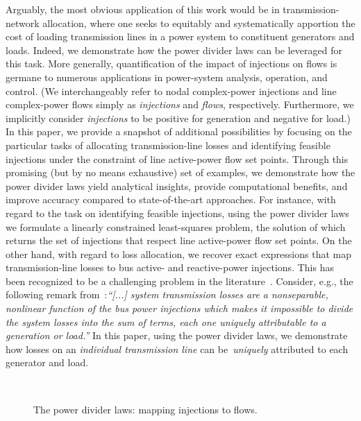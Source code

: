 \documentclass[journal]{IEEEtran}
\theoremstyle{definition}
\begin{document}
Arguably, the most obvious application of this work would be in transmission-network allocation, where one seeks to equitably and systematically apportion the cost of loading transmission lines in a power system to constituent generators and loads.  Indeed, we demonstrate how the power divider laws can be leveraged for this task. More generally, quantification of the impact of injections on flows is germane to numerous applications in power-system analysis, operation, and control. (We interchangeably refer to nodal complex-power injections and line complex-power flows simply as \emph{injections} and \emph{flows}, respectively. Furthermore, we  implicitly consider \emph{injections} to be positive for generation and negative for load.) In this paper, we provide a snapshot of additional possibilities by focusing on the particular tasks of allocating transmission-line losses and identifying feasible injections under the constraint of line active-power flow set points.  Through this promising (but by no means exhaustive) set of examples, we demonstrate how the power divider laws yield analytical insights, provide computational benefits, and improve accuracy compared to state-of-the-art approaches.  For instance, with regard to the task on identifying feasible injections, using the power divider laws we formulate a linearly constrained least-squares problem, the solution of which returns the set of injections that respect line active-power flow set points. On the other hand, with regard to loss allocation, we recover exact expressions that map transmission-line losses to  bus active- and reactive-power injections.  This has been recognized to be a challenging problem in the literature~\cite{Conejo:2002, Ding:2006}.  Consider, e.g., the following remark from~\cite{Conejo-2001}:\emph{``[...] system transmission losses are a nonseparable, nonlinear function of the bus power injections  which makes it impossible to divide the system losses into the sum of terms, each one uniquely attributable to a generation or load.''} In this paper, using the power divider laws, we demonstrate how losses on an \emph{individual transmission line} can be~\emph{uniquely} attributed to each generator and load.

\begin{figure}[t!]
\centering
\mbox{
}
\caption{The power divider laws: mapping injections to flows.}
\label{fig:cloud}
\vspace{-14pt}
\end{figure}
\end{document}
